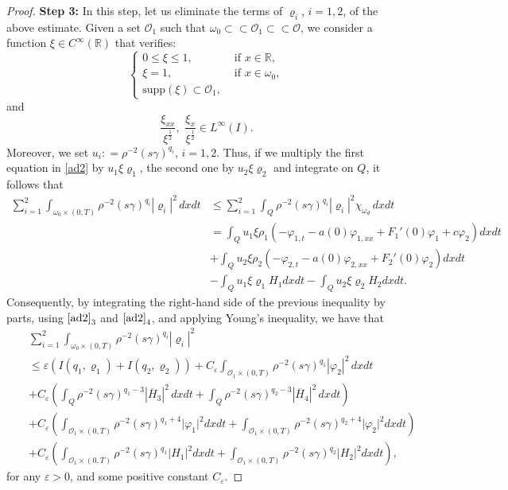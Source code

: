 \documentclass[11pt,a4paper]{amsart}
\numberwithin{equation}{section}
\begin{document}
\begin{proof}
\textbf{Step 3:}  In this step, let us eliminate the terms of $\varrho_i$, $i=1,2$, of the above estimate. Given a set $\mathcal{O}_1$ such that $\omega_0 \subset \subset \mathcal{O}_1 \subset \subset \mathcal{O}$, we consider a function $\xi \in C^\infty (\mathbb{R})$ that verifies:
\begin{equation*}
    \begin{cases}
        0\leq \xi \leq 1, &\text{ if }x \in\mathbb{R}, \\
        \xi = 1, &\text{ if } x \in \omega_0, \\
        \text{supp}(\xi) \subset \mathcal{O}_1,
    \end{cases}
\end{equation*} and
\begin{equation*}
    \frac{\xi_{xx}}{\xi^\frac{1}{2}}, \, \, 
    \frac{\xi_x}{\xi^\frac{1}{2}}\in L^\infty(I).
\end{equation*}Moreover, we set $u_i: = \rho^{-2}(s\gamma)^{q_i}$, $i=1,2$. Thus, if we multiply the first equation in \eqref{ad2} by $u_1\xi\varrho_1$, the second one  by $u_2\xi\varrho_2$ and integrate on $Q$, it follows that
\begin{align*}
\sum_{i=1}^{2}\int_{\omega_0\times (0,T)} \rho^{-2} (s \gamma)^{q_i} |\varrho_i|^2\,dxdt&\leq \sum_{i=1}^{2}\int_{Q} \rho^{-2} (s \gamma)^{q_i} |\varrho_i|^2\chi_{\omega_{d}}\,dxdt \\
&  = \int_{Q} u_1\xi\rho_1(-\varphi_{1,t}-a(0)\varphi_{1,xx}+F_1'(0)\varphi_1+c\varphi_2 )  dxdt\\
&+\int_{Q}u_2\xi\rho_2(	-\varphi_{2,t}-a(0)\varphi_{2,xx}+F_2'(0)\varphi_2) dxdt\\
& -\int_{Q}u_1\xi\varrho_1H_1dxdt-\int_{Q}u_2\xi\varrho_2H_2dxdt.
\end{align*}Consequently, by integrating the right-hand side of the previous inequality by parts, using $\eqref{ad2}_3$ and $\eqref{ad2}_4$, and applying Young's inequality,  we have that
\begin{eqnarray*}
&& \sum_{i=1}^{2}\int_{\omega_0\times (0,T)} \rho^{-2} ( s \gamma)^{q_i} |\varrho_i|^2\\
&&\leq \varepsilon  \left(I(q_1,\varrho_1) +  I(q_2,\varrho_2)\right)+C_{\varepsilon}\int_{\mathcal{O}_{1}\times(0,T)}\rho^{-2}(s\gamma)^{q_{1}}|\varphi_{2}|^{2}\,dxdt\\
&&
 +C_{\varepsilon}\left( \int_{Q}\rho^{-2}(s\gamma)^{q_{1}-3}|\overline{H}_{3}|^{2}\,dxdt+\int_{Q}\rho^{-2}(s\gamma)^{q_{2}-3}|\overline{H}_{4}|^{2}\,dxdt  \right)     \\
&& + C_{\varepsilon} \left(\int_{\mathcal{O}_1\times (0,T)}\rho^{-2}(s\gamma)^{q_1+4}\vert \varphi_1 \vert^2dxdt+\int_{\mathcal{O}_1\times (0,T)}\rho^{-2}(s\gamma)^{q_2+4}\vert \varphi_2 \vert^2dxdt\right)\\
&& + C_{\varepsilon}\left(\int_{\mathcal{O}_1\times (0,T)}\rho^{-2}(s\gamma)^{q_1}\vert H_1\vert^2dxdt+\int_{\mathcal{O}_1\times (0,T)}\rho^{-2}(s\gamma)^{q_2}\vert H_2\vert^2dxdt\right),
\end{eqnarray*}for any $\varepsilon>0$, and some positive constant $C_{\varepsilon}$.


\end{proof}
\end{document}
